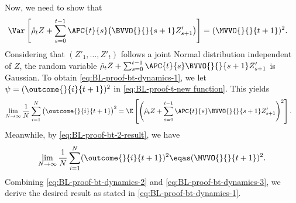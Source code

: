 \begin{enumerate}[label=(\alph*)]
        Now, we need to show that
        \begin{equation}
            \label{eq:BL-proof-bt-dynamics-1}
            \begin{aligned}
                \Var
                \left[
                \hat{\rho}_{t} Z
                +
                \sum_{s=0}^{t-1}
                \APC{t}{s}
                \big(
                \BVVO{}{}{s+1}
                Z'_{s+1}
                \big)
                \right]
                &=
                (\MVVO{}{}{t+1})^2.
            \end{aligned}
        \end{equation}
        Considering that $(Z'_1,\ldots,Z'_t)$ follows a joint Normal distribution independent of $Z$, the random variable $\hat{\rho}_{t} Z + \sum_{s=0}^{t-1} \APC{t}{s} \BVVO{}{}{s+1} Z'_{s+1}$ is Gaussian. To obtain \eqref{eq:BL-proof-bt-dynamics-1}, we let $\psi = (\outcome{}{i}{t+1})^2$ in \eqref{eq:BL-proof-t-new function}. This yields
        \begin{equation}
            \label{eq:BL-proof-bt-dynamics-2}
            \begin{aligned}
                \lim_{N \rightarrow \infty}
                \frac{1}{N}
                \sum_{i=1}^N
                \big(
                \outcome{}{i}{t+1}\big)^2
                &=
                \E
                \left[
                \left(
                \hat{\rho}_{t} Z
                +
                \sum_{s=0}^{t-1}
                \APC{t}{s}
                \BVVO{}{}{s+1}
                Z'_{s+1}
                \right)^2
                \right].
            \end{aligned}
        \end{equation}
        Meanwhile, by \eqref{eq:BL-proof-bt-2-result}, we have
        \begin{align}
        \label{eq:BL-proof-bt-dynamics-3}
            \lim_{N \rightarrow \infty}
            \frac{1}{N}
            \sum_{i=1}^N
            (\outcome{}{i}{t+1})^2
            \eqas
            (\MVVO{}{}{t+1})^2.
        \end{align}
        Combining \eqref{eq:BL-proof-bt-dynamics-2} and \eqref{eq:BL-proof-bt-dynamics-3}, we derive the desired result as stated in \eqref{eq:BL-proof-bt-dynamics-1}.


\end{enumerate}
